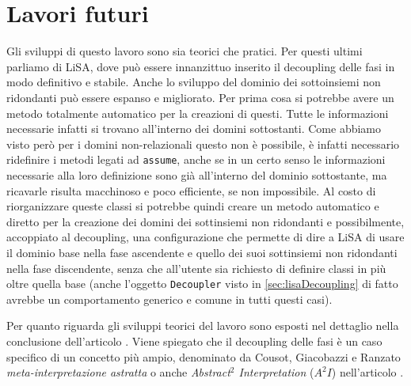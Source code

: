 \section{Lavori futuri}
Gli sviluppi di questo lavoro sono sia teorici che pratici. Per questi ultimi parliamo di LiSA, dove può essere innanzittuo inserito il decoupling delle fasi in modo definitivo e stabile. Anche lo sviluppo del dominio dei sottoinsiemi non ridondanti può essere espanso e migliorato. Per prima cosa si potrebbe avere un metodo totalmente automatico per la creazioni di questi. Tutte le informazioni necessarie infatti si trovano all'interno dei domini sottostanti. Come abbiamo visto però per i domini non-relazionali questo non è possibile, è infatti necessario ridefinire i metodi legati ad \texttt{assume}, anche se in un certo senso le informazioni necessarie alla loro definizione sono già all'interno del dominio sottostante, ma ricavarle risulta macchinoso e poco efficiente, se non impossibile. Al costo di riorganizzare queste classi si potrebbe quindi creare un metodo automatico e diretto per la creazione dei domini dei sottinsiemi non ridondanti e possibilmente, accoppiato al decoupling, una configurazione che permette di dire a LiSA di usare il dominio base nella fase ascendente e quello dei suoi sottinsiemi non ridondanti nella fase discendente, senza che all'utente sia richiesto di definire classi in più oltre quella base (anche l'oggetto \texttt{Decoupler} visto in \ref{sec:lisaDecoupling} di fatto avrebbe un comportamento generico e comune in tutti questi casi). 

Per quanto riguarda gli sviluppi teorici del lavoro sono esposti nel dettaglio nella conclusione dell'articolo \cite{DBLP:conf/aplas/ArceriMZ22}. Viene spiegato che il decoupling delle fasi è un caso specifico di un concetto più ampio, denominato da Cousot, Giacobazzi e Ranzato \textit{meta-interpretazione astratta} o anche \textit{Abstract\(^2\) Interpretation} (\(A^2I\)) nell'articolo \cite{10.1145/3290355}. 
